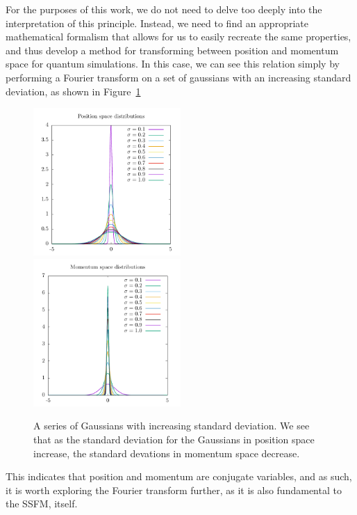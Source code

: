 For the purposes of this work, we do not need to delve too deeply into the interpretation of this principle.
Instead, we need to find an appropriate mathematical formalism that allows for us to easily recreate the same properties, and thus develop a method for transforming between position and momentum space for quantum simulations.
In this case, we can see this relation simply by performing a Fourier transform on a set of gaussians with an increasing standard deviation, as shown in Figure~\ref{fig:uncertain}

\begin{figure}

\includegraphics[width = 0.5\textwidth]{data/qs/Heisenberg/position.pdf}
\includegraphics[width = 0.5\textwidth]{data/qs/Heisenberg/momentum.pdf}

\caption{A series of Gaussians with increasing standard deviation. We see that as the standard deviation for the Gaussians in position space increase, the standard devations in momentum space decrease.}
\label{fig:uncertain}
\end{figure}

This indicates that position and momentum are conjugate variables, and 
as such, it is worth exploring the Fourier transform further, as it is also fundamental to the SSFM, itself.

